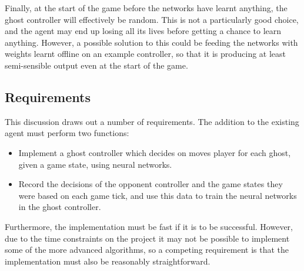 Finally, at the start of the game before the networks have learnt anything, the ghost controller will effectively be random.  This is not a particularly good choice, and the agent may end up losing all its lives before getting a chance to learn anything.  However, a possible solution to this could be feeding the networks with weights learnt offline on an example controller, so that it is producing at least semi-sensible output even at the start of the game.

\subsection{Requirements}

This discussion draws out a number of requirements.  The addition to the existing agent must perform two functions:

\begin{itemize}
\item Implement a ghost controller which decides on moves player for each ghost, given a game state, using neural networks.
\item Record the decisions of the opponent controller and the game states they were based on each game tick, and use this data to train the neural networks in the ghost controller.
\end{itemize}

Furthermore, the implementation must be fast if it is to be successful.  However, due to the time constraints on the project it may not be possible to implement some of the more advanced algorithms, so a competing requirement is that the implementation must also be reasonably straightforward.



